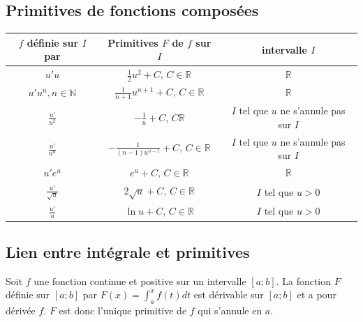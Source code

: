 \documentclass[french]{book}
\begin{document}
\subsection{Primitives de fonctions composées}

\begin{exemple}
\begin{center}
 \begin{tabular}{|c|c|c|}
  \hline
$f$ définie sur $I$ par & Primitives $F$ de $f$ sur $I$ & intervalle $I$ \\
\hline
$u'u$ & $\frac{1}{2}u^2+C,\, C\in\mathbb{R}$ & $\mathbb{R}$ \\
\hline
$u'u^n, n\in\mathbb{N}$ & $\frac{1}{n+1}u^{n+1}+C,\, C\in\mathbb{R}$ & $\mathbb{R}$ \\
\hline
$\frac{u'}{u^2}$ & $-\frac{1}{u}+C,\, C\mathbb{R}$ & $I$ tel que $u$ ne s'annule pas sur $I$ \\
\hline
$\frac{u'}{u^n}$ & $-\frac{1}{(n-1)u^{n-1}}+C,\, C\in\mathbb{R}$ & $I$ tel que $u$ ne s'annule pas sur $I$ \\
\hline
$u'e^u$ & $e^u+C,\,C\in\mathbb{R}$ & $\mathbb{R}$ \\
\hline
$\frac{u'}{\sqrt{u}}$ & 2$\sqrt{u}+C,\, C\in\mathbb{R}$ & $I$ tel que $u>0$ \\
\hline
$\frac{u'}{u}$ & $\ln u+C,\, C\in \mathbb{R}$ & $I$ tel que $u>0$ \\
\hline
\end{tabular}
\end{center}
\end{exemple}
\subsection{Lien entre intégrale et primitives}


\begin{thm}
 Soit $f$ une fonction continue et positive sur un intervalle $[a;b]$. La fonction $F$ définie sur $[a;b]$ par $F(x)=\int_{a}^{x}f(t)dt$ est dérivable sur $[a;b]$ et a pour dérivée $f$. $F$ est donc l'unique primitive de $f$ qui s'annule en $a$.
\end{thm}
\end{document}
